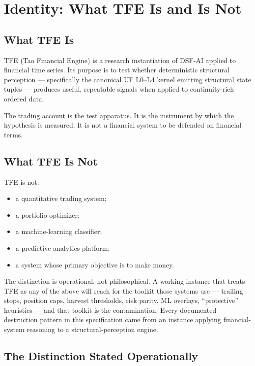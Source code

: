 \documentclass[11pt, a4paper]{article}
\theoremstyle{definition}
\begin{document}
\tableofcontents
\newpage

\section{Identity: What TFE Is and Is Not}

\subsection{What TFE Is}

TFE (Tao Financial Engine) is a research instantiation of DSF-AI applied to
financial time series. Its purpose is to test whether deterministic structural
perception --- specifically the canonical UF L0--L4 kernel emitting structural
state tuples --- produces useful, repeatable signals when applied to
continuity-rich ordered data.

The trading account is the test apparatus. It is the instrument by which the
hypothesis is measured. It is not a financial system to be defended on
financial terms.

\subsection{What TFE Is Not}

TFE is not:

\begin{itemize}
\item a quantitative trading system;
\item a portfolio optimizer;
\item a machine-learning classifier;
\item a predictive analytics platform;
\item a system whose primary objective is to make money.
\end{itemize}

The distinction is operational, not philosophical. A working instance that
treats TFE as any of the above will reach for the toolkit those systems use
--- trailing stops, position caps, harvest thresholds, risk parity, ML
overlays, ``protective'' heuristics --- and that toolkit is the contamination.
Every documented destruction pattern in this specification came from an
instance applying financial-system reasoning to a structural-perception engine.

\subsection{The Distinction Stated Operationally}
\end{document}
